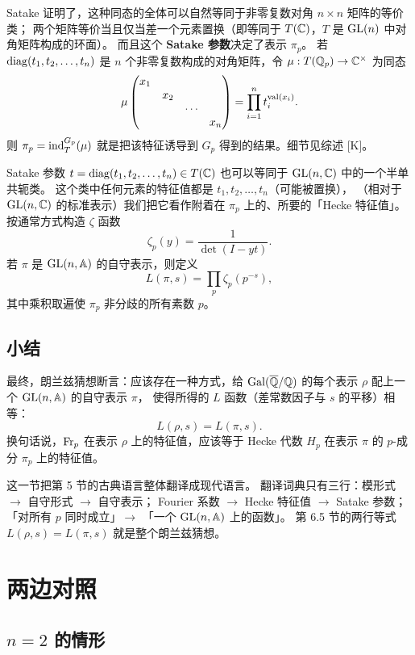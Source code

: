 Satake 证明了，这种同态的全体可以自然等同于非零复数对角 $n\times n$ 矩阵的等价类；
两个矩阵等价当且仅当差一个元素置换（即等同于 $T(\mathbb{C})$，$T$ 是 $\mathrm{GL}(n)$ 中对角矩阵构成的环面）。
而且这个 \textbf{Satake 参数}决定了表示 $\pi_p$。
若 $\mathrm{diag}(t_1,t_2,\dots,t_n)$ 是 $n$ 个非零复数构成的对角矩阵，令 $\mu:T(\mathbb{Q}_p)\to\mathbb{C}^{\times}$ 为同态
\[
\mu\begin{pmatrix}x_1&&&\\&x_2&&\\&&\cdots&\\&&&x_n\end{pmatrix}
=\prod_{i=1}^{n}t_i^{\mathrm{val}(x_i)} .
\]
则 $\pi_p=\mathrm{ind}_T^{G_p}(\mu)$ 就是把该特征诱导到 $G_p$ 得到的结果。细节见综述 [K]。

Satake 参数 $t=\mathrm{diag}(t_1,t_2,\dots,t_n)\in T(\mathbb{C})$ 也可以等同于 $\mathrm{GL}(n,\mathbb{C})$ 中的一个半单共轭类。
这个类中任何元素的特征值都是 $t_1,t_2,\dots,t_n$（可能被置换），
（相对于 $\mathrm{GL}(n,\mathbb{C})$ 的标准表示）我们把它看作附着在 $\pi_p$ 上的、所要的「Hecke 特征值」。
按通常方式构造 $\zeta$ 函数
\[
\zeta_p(y)=\frac{1}{\det(I-yt)} .
\]
若 $\pi$ 是 $\mathrm{GL}(n,\mathbb{A})$ 的自守表示，则定义
\[
L(\pi,s)=\prod_p\zeta_p(p^{-s}),
\]
其中乘积取遍使 $\pi_p$ 非分歧的所有素数 $p$。

\subsection{小结}

最终，朗兰兹猜想断言：应该存在一种方式，给 $\mathrm{Gal}(\overline{\mathbb{Q}}/\mathbb{Q})$ 的每个表示 $\rho$ 配上一个 $\mathrm{GL}(n,\mathbb{A})$ 的自守表示 $\pi$，
使得所得的 $L$ 函数（差常数因子与 $s$ 的平移）相等：
\[
L(\rho,s)=L(\pi,s).
\]
换句话说，$\mathrm{Fr}_p$ 在表示 $\rho$ 上的特征值，应该等于 Hecke 代数 $H_p$ 在表示 $\pi$ 的 $p$-成分 $\pi_p$ 上的特征值。

\begin{keytakeaways}
这一节把第 5 节的古典语言整体翻译成现代语言。
翻译词典只有三行：模形式 $\to$ 自守形式 $\to$ 自守表示；
Fourier 系数 $\to$ Hecke 特征值 $\to$ Satake 参数；
「对所有 $p$ 同时成立」$\to$ 「一个 $\mathrm{GL}(n,\mathbb{A})$ 上的函数」。
第 6.5 节的两行等式 $L(\rho,s)=L(\pi,s)$ 就是整个朗兰兹猜想。
\end{keytakeaways}

\section{两边对照}
\label{sec:compare}

\subsection{$n=2$ 的情形}

